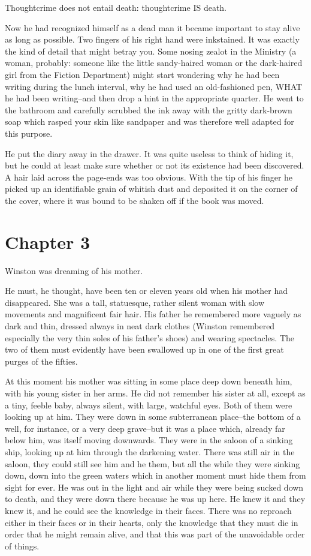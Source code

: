 \documentclass{article}
\begin{document}
   Thoughtcrime does not entail death: thoughtcrime IS death.


Now he had recognized himself as a dead man it became important to stay
alive as long as possible. Two fingers of his right hand were inkstained.
It was exactly the kind of detail that might betray you. Some nosing zealot
in the Ministry (a woman, probably: someone like the little sandy-haired
woman or the dark-haired girl from the Fiction Department) might start
wondering why he had been writing during the lunch interval, why he had
used an old-fashioned pen, WHAT he had been writing--and then drop a hint
in the appropriate quarter. He went to the bathroom and carefully scrubbed
the ink away with the gritty dark-brown soap which rasped your skin like
sandpaper and was therefore well adapted for this purpose.

He put the diary away in the drawer. It was quite useless to think of
hiding it, but he could at least make sure whether or not its existence had
been discovered. A hair laid across the page-ends was too obvious. With the
tip of his finger he picked up an identifiable grain of whitish dust and
deposited it on the corner of the cover, where it was bound to be shaken
off if the book was moved.




\section{Chapter 3}



Winston was dreaming of his mother.

He must, he thought, have been ten or eleven years old when his mother had
disappeared. She was a tall, statuesque, rather silent woman with slow
movements and magnificent fair hair. His father he remembered more vaguely
as dark and thin, dressed always in neat dark clothes (Winston remembered
especially the very thin soles of his father's shoes) and wearing
spectacles. The two of them must evidently have been swallowed up in one
of the first great purges of the fifties.

At this moment his mother was sitting in some place deep down beneath him,
with his young sister in her arms. He did not remember his sister at all,
except as a tiny, feeble baby, always silent, with large, watchful eyes.
Both of them were looking up at him. They were down in some subterranean
place--the bottom of a well, for instance, or a very deep grave--but it
was a place which, already far below him, was itself moving downwards.
They were in the saloon of a sinking ship, looking up at him through the
darkening water. There was still air in the saloon, they could still see
him and he them, but all the while they were sinking down, down into the
green waters which in another moment must hide them from sight for ever.
He was out in the light and air while they were being sucked down to death,
and they were down there because he was up here. He knew it and they knew
it, and he could see the knowledge in their faces. There was no reproach
either in their faces or in their hearts, only the knowledge that they
must die in order that he might remain alive, and that this was part of
the unavoidable order of things.
\end{document}
